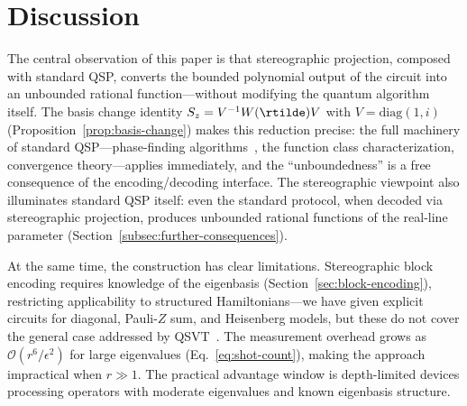 \section{Discussion}
\label{sec:discussion}

The central observation of this paper is that stereographic
projection, composed with standard QSP, converts the bounded
polynomial output of the circuit into an unbounded rational
function---without modifying the quantum algorithm itself.  The
basis change identity
$S_z = V^{-1}W(\rtilde)V$ with $V = \mathrm{diag}(1,i)$
(Proposition~\ref{prop:basis-change}) makes this reduction
precise: the full machinery of standard QSP---phase-finding
algorithms~\cite{DongMengWhaleyEtAl2021,Haah2019}, the
function class characterization, convergence theory---applies
immediately, and the ``unboundedness'' is a free consequence of
the encoding/decoding interface.  The stereographic viewpoint
also illuminates standard QSP itself: even the standard
protocol, when decoded via stereographic projection, produces
unbounded rational functions of the real-line parameter
(Section~\ref{subsec:further-consequences}).

At the same time, the construction has clear limitations.
Stereographic block encoding requires knowledge of the
eigenbasis (Section~\ref{sec:block-encoding}), restricting
applicability to structured Hamiltonians---we have given
explicit circuits for diagonal, Pauli-$Z$ sum, and Heisenberg
models, but these do not cover the general case addressed by
QSVT~\cite{GSLW2019}.  The measurement overhead grows as
$\mathcal{O}(r^6/\epsilon^2)$ for large eigenvalues
(Eq.~\eqref{eq:shot-count}), making the approach impractical
when $r \gg 1$.  The practical advantage window is
depth-limited devices processing operators with moderate
eigenvalues and known eigenbasis structure.

